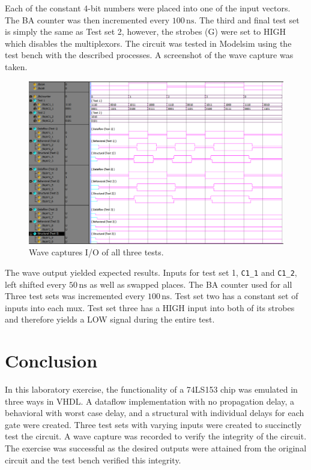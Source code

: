 \documentclass[CMPE]{KGCOEReport}
\begin{document}
Each of the constant 4-bit numbers were placed into one of the input vectors. The BA counter was then incremented every $100\,\si{\nano\s}$.
The third and final test set is simply the same as Test set 2, however, the strobes (G) were set to HIGH which disables the multiplexors.
The circuit was tested in Modelsim using the test bench with the described processes. A screenshot of the wave capture was taken.

\begin{figure}[h!]
	\centering
	\includegraphics[width=\textwidth]{capture}
	\caption{Wave captures I/O of all three tests.}
	\label{fig:capture}
\end{figure}

The wave output yielded expected results. Inputs for test set 1, \texttt{C1\_1} and \texttt{C1\_2}, left shifted every $50\,\si{\nano\s}$ as well as swapped places. The BA counter used for all Three test sets was incremented every $100\,\si{\nano\s}$. Test set two has a constant set of inputs into each mux. Test set three has a HIGH input into both of its strobes and therefore yields a LOW signal during the entire test.

\section*{Conclusion}

In this laboratory exercise, the functionality of a 74LS153 chip was emulated in three ways in VHDL. A dataflow implementation with no propagation delay, a behavioral with worst case delay, and a structural with individual delays for each gate were created. Three test sets with varying inputs were created to succinctly test the circuit. A wave capture was recorded to verify the integrity of the circuit. The exercise was successful as the desired outputs were attained from the original circuit and the test bench verified this integrity.
\end{document}
